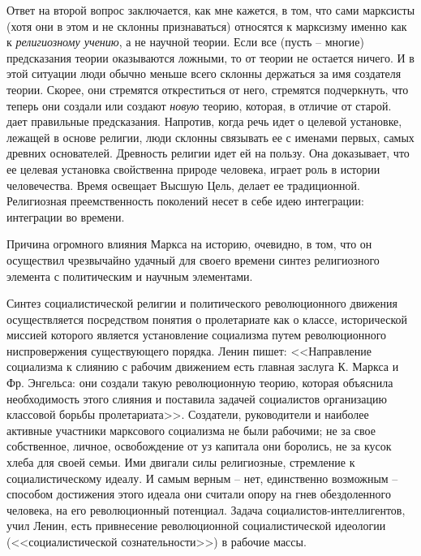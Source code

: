 \documentclass{book}
\begin{document}
Ответ на второй вопрос заключается, как мне кажется, в том, что сами марксисты (хотя они в этом и не склонны признаваться) относятся к марксизму именно как к \textit{религиозному учению},  а не научной теории. Если все (пусть -- многие) предсказания теории оказываются ложными, то от теории не остается ничего. И в этой ситуации люди обычно меньше всего склонны держаться за имя создателя теории. Скорее, они стремятся откреститься от него, стремятся подчеркнуть, что теперь они создали или создают \textit{новую}  теорию, которая, в отличие от старой. дает правильные предсказания. Напротив, когда речь идет о целевой установке, лежащей в основе религии, люди склонны связывать ее с именами первых, самых древних основателей. Древность религии идет ей на пользу. Она доказывает, что ее целевая установка свойственна природе человека, играет роль в истории человечества. Время освещает Высшую Цель, делает ее традиционной. Религиозная преемственность поколений несет в себе идею интеграции: интеграции во времени.

Причина огромного влияния Маркса на историю, очевидно, в том, что он осуществил чрезвычайно удачный для своего вре­мени синтез религиозного элемента с политическим и научным элементами.

Синтез социалистической религии и политического революционного движения осуществляется посредством понятия о пролетариате как о классе, исторической миссией которого является установление социализма путем революционного ниспровержения существующего порядка. Ленин пишет: <<Направ­ление социализма к слиянию с рабочим движением есть главная заслуга К. Маркса и Фр. Энгельса: они создали такую револю­ционную теорию, которая объяснила необходимость этого слия­ния и поставила задачей социалистов организацию классовой борьбы пролетариата>>. Создатели, руководители и наиболее активные участники марксового социализма не были рабочими; не за свое собственное, личное, освобождение от уз капитала они боролись, не за кусок хлеба для своей семьи. Ими двигали силы религиозные, стремление к социалистическому иде­алу. И самым верным -- нет, единственно возможным -- способом достижения этого идеала они считали опору на гнев обездоленного человека, на его революционный потенциал. Задача социалистов-интеллигентов, учил Ленин, 
есть привнесение революционной социалистической идеологии (<<социалистической сознательности>>) в рабочие массы.
\end{document}
